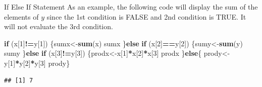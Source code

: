 \documentclass[
  ignorenonframetext,
]{beamer}
\newenvironment{Shaded}{\begin{snugshade}}{\end{snugshade}}
\newcommand{\ControlFlowTok}[1]{\textcolor[rgb]{0.13,0.29,0.53}{\textbf{#1}}}
\newcommand{\DecValTok}[1]{\textcolor[rgb]{0.00,0.00,0.81}{#1}}
\newcommand{\FunctionTok}[1]{\textcolor[rgb]{0.13,0.29,0.53}{\textbf{#1}}}
\newcommand{\NormalTok}[1]{#1}
\newcommand{\OtherTok}[1]{\textcolor[rgb]{0.56,0.35,0.01}{#1}}
\newcommand{\SpecialCharTok}[1]{\textcolor[rgb]{0.81,0.36,0.00}{\textbf{#1}}}
\begin{document}
\begin{frame}[fragile]{If Else If Statement}
\protect\hypertarget{if-else-if-statement-1}{}
As an example, the following code will display the sum of the elements
of \(y\) since the 1st condition is FALSE and 2nd condition is TRUE. It
will not evaluate the 3rd condition.

\small

\begin{Shaded}
\begin{Highlighting}[]
\ControlFlowTok{if}\NormalTok{ (x[}\DecValTok{1}\NormalTok{]}\SpecialCharTok{!=}\NormalTok{y[}\DecValTok{1}\NormalTok{])}
\NormalTok{  \{sumx}\OtherTok{\textless{}{-}}\FunctionTok{sum}\NormalTok{(x)}
\NormalTok{   sumx}
\NormalTok{  \}}\ControlFlowTok{else} \ControlFlowTok{if}\NormalTok{ (x[}\DecValTok{2}\NormalTok{]}\SpecialCharTok{==}\NormalTok{y[}\DecValTok{2}\NormalTok{])}
\NormalTok{   \{sumy}\OtherTok{\textless{}{-}}\FunctionTok{sum}\NormalTok{(y)}
\NormalTok{   sumy}
\NormalTok{   \}}\ControlFlowTok{else} \ControlFlowTok{if}\NormalTok{ (x[}\DecValTok{3}\NormalTok{]}\SpecialCharTok{!=}\NormalTok{y[}\DecValTok{3}\NormalTok{])}
\NormalTok{   \{prodx}\OtherTok{\textless{}{-}}\NormalTok{x[}\DecValTok{1}\NormalTok{]}\SpecialCharTok{*}\NormalTok{x[}\DecValTok{2}\NormalTok{]}\SpecialCharTok{*}\NormalTok{x[}\DecValTok{3}\NormalTok{]}
\NormalTok{   prodx}
\NormalTok{   \}}\ControlFlowTok{else}\NormalTok{\{}
\NormalTok{   prody}\OtherTok{\textless{}{-}}\NormalTok{y[}\DecValTok{1}\NormalTok{]}\SpecialCharTok{*}\NormalTok{y[}\DecValTok{2}\NormalTok{]}\SpecialCharTok{*}\NormalTok{y[}\DecValTok{3}\NormalTok{]}
\NormalTok{   prody\}}
\end{Highlighting}
\end{Shaded}

\begin{verbatim}
## [1] 7
\end{verbatim}

\normalsize
\end{frame}
\end{document}
